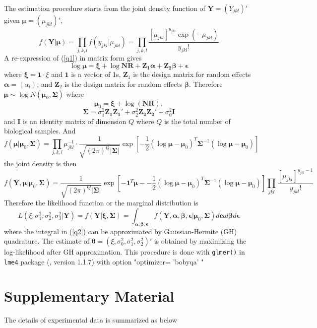 \documentclass[11pt, a4paper]{article}
\begin{document}
The estimation procedure starts from the joint density function of $\bm Y=(Y_{jkl})'$ given $\bm \mu= (\mu_{jkl})'$, 
\[f(\bm Y|\bm \mu )=\prod_{ j, k,l}f(y_{jkl}|\mu_{jkl})=\prod_{j,k,l}\frac{[\mu_{jkl}]^{y_{jkl}}\exp(-\mu_{jkl})}{y_{jkl}!}\]
A re-expression of  (\ref{q1}) in matrix form gives 
\[\log\bm \mu= \bm \xi + \log{\bm{NR}} + \bm {Z_1\alpha} + \bm{Z_2\beta} + \bm \epsilon \]
where $\bm \xi = \bm 1\cdot\xi$ and $\bm 1$ is a vector of 1s, $\bm Z_1$ is the design matrix for random effects $\bm \alpha=(\alpha_l)$, and $\bm Z_2$ is the design matrix for random effects $\bm \beta $. 
Therefore  $\bm\mu  \sim \log N(\bm \mu_0, \bm \Sigma)$ where 
$$\bm \mu_0 =\bm\xi + \log(\bm {NR}),$$ 
$$\bm \Sigma = \sigma_1^2\bm {Z_1Z_1'} + \sigma_2^2\bm {Z_2 Z_2'} +\sigma_0^2 \bm I$$
and $\bm I$ is an identity matrix of dimension $Q$ where $Q$ is the total number of biological samples. 
And 
\[f(\bm \mu |\bm \mu_0, \bm \Sigma)=\prod_{j,k,l} \mu_{jkl}^{-1}\cdot \frac{1}{ \sqrt{(2\pi)^Q|\bm\Sigma|}}\exp[-\frac{1}{2} {(\log\bm \mu - \bm \mu_0)^T\bm \Sigma^{-1}(\log\bm \mu - \bm \mu_0)}]\]
the joint density is then
\[f(\bm Y, \bm \mu |\bm \mu_0, \bm \Sigma) =\frac{1}{\sqrt{(2\pi)^Q|\bm \Sigma|}}\exp[-\bm 1^T\bm \mu - -\frac{1}{2} {(\log\bm \mu - \bm \mu_0)^T\bm \Sigma^{-1}(\log\bm \mu - \bm \mu_0)}]\prod_{jkl}\frac{[\mu_{jkl}]^{y_{jkl}-1}}{y_{jkl}!}\]
Therefore the likelihood function or the marginal distribution is 
\begin{equation}\label{q2}
L(\xi, \sigma_1^2, \sigma_2^2, \sigma_3^2|\bm Y)=f(\bm Y|\bm \xi, \bm \Sigma)= \int_{\bm{\alpha,\beta,\epsilon}} f(\bm Y, \bm \alpha, \bm \beta, \bm \epsilon |\bm \mu_0, \bm \Sigma)d\bm \alpha d \bm\beta d\bm \epsilon 
\end{equation}
where the integral in (\ref{q2}) can be approximated by Gaussian-Hermite (GH) quadrature. The estimate of $\bm\theta = (\xi, \sigma_0^2, \sigma_1^2, \sigma_2^2)'$ is obtained by maximizing the log-likelihood after GH approximation.  This procedure is done with \verb"glmer()"  in \verb"lme4"  package (\cite{bates2012lme4}, version 1.1.7)  with option  "optimizer= 'bobyqa' " 


\section{Supplementary Material}

The details of experimental data is summarized as below
\end{document}
